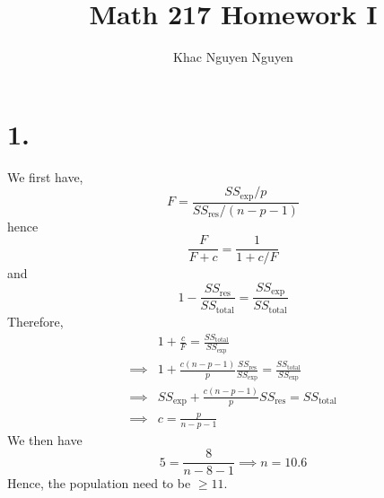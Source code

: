 \documentclass[11pt]{article}
\title{\textbf{Math 217 Homework I}}
\author{Khac Nguyen Nguyen}
\date{}
\theoremstyle{mystyle}
\theoremstyle{definition}
\begin{document}
\section*{1.}
We first have, 
\[
  F = \displaystyle\frac{SS_{\exp}/p}{SS_{\text{res}}/(n-p-1)}
\]
hence
\[
  \displaystyle\frac{F}{F+c} = \displaystyle\frac{1}{1 + c/F}
\]
and  
\[
  1 - \displaystyle\frac{SS_{\text{res}}}{SS_{\text{total}}} = \displaystyle\frac{SS_{\exp}}{SS_{\text{total}}}
\]
Therefore,
\begin{align*} 
  &1 + \displaystyle\frac{c}{F} = \frac{SS_\text{total}}{SS_{\exp}}\\
  \implies &1 + \displaystyle\frac{c(n-p-1)}{p} \displaystyle\frac{SS_\text{res}}{SS_{\exp}} = \frac{SS_\text{total}}{SS_{\exp}}\\
  \implies &SS_{\exp}+ \displaystyle\frac{c(n-p-1)}{p} SS_\text{res} = SS_\text{total} \\
  \implies &c = \displaystyle\frac{p}{n-p-1}
\end{align*}
We then have 
\[
  5 = \displaystyle\frac{8}{n-8-1} \implies n = 10.6 
\]
Hence, the population need to be $\ge 11$. 
\pagebreak
\end{document}
